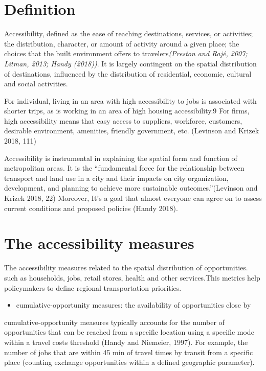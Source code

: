 \documentclass[12pt,]{article}
\providecommand{\tightlist}{%
  \setlength{\itemsep}{0pt}\setlength{\parskip}{0pt}}
\begin{document}
\hypertarget{definition}{%
\section{Definition}\label{definition}}

Accessibility, defined as the ease of reaching destinations, services,
or activities; the distribution, character, or amount of activity around
a given place; the choices that the built environment offers to
travelers\emph{(Preston and Rajé, 2007; Litman, 2013; Handy (2018))}. It
is largely contingent on the spatial distribution of destinations,
influenced by the distribution of residential, economic, cultural and
social activities.

For individual, living in an area with high accessibility to jobs is
associated with shorter trips, as is working in an area of high housing
accessibility.9 For firms, high accessibility means that easy access to
suppliers, workforce, customers, desirable environment, amenities,
friendly government, etc. (Levinson and Krizek 2018, 111)

Accessibility is instrumental in explaining the spatial form and
function of metropolitan areas. It is the ``fundamental force for the
relationship between transport and land use in a city and their impacts
on city organization, development, and planning to achieve more
sustainable outcomes.''(Levinson and Krizek 2018, 22) Moreover, It's a
goal that almost everyone can agree on to assess current conditions and
proposed policies (Handy 2018).

\hypertarget{the-accessibility-measures}{%
\section{The accessibility measures}\label{the-accessibility-measures}}

The accessibility measures related to the spatial distribution of
opportunities. such as households, jobs, retail stores, health and other
services.This metrics help policymakers to define regional
transportation priorities.

\begin{itemize}
\tightlist
\item
  cumulative-opportunity measures: the availability of opportunities
  close by
\end{itemize}

cumulative-opportunity measures typically accounts for the number of
opportunities that can be reached from a specific location using a
specific mode within a travel costs threshold (Handy and Niemeier,
1997). For example, the number of jobs that are within 45 min of travel
times by transit from a specific place (counting exchange opportunities
within a defined geographic parameter).
\end{document}

